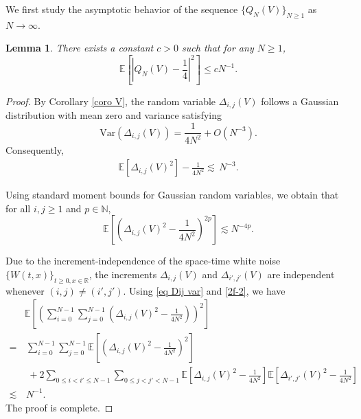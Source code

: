 \documentclass[11pt,reqno]{amsart}
\numberwithin{equation}{section}
\newtheorem{lemma}{Lemma}[section]
\newcommand{\1}{{\bf 1}}
\newcommand{\2}{{\bf 2}}
\begin{document}
   We first  study  the asymptotic behavior of the sequence   $\{Q_{N}(V)\}_{ N\ge 1}$  as $N\rightarrow\infty$.
  	 	    	\begin{lemma}\label{lem linear app}   There exists a constant $c>0$ such that for any $N\ge 1$, 
		\begin{equation}\label{2f-10}
			\mathbb{E}\left[ \left| Q_{N}(V) -\frac14\right|^2   \right]  \le c N^{-1}.
					\end{equation} 
	\end{lemma}
 \begin{proof}
By  Corollary \ref{coro V},     the random variable  $ \Delta_{i,j}(V)$  follows  a  Gaussian distribution with mean zero and   variance  satisfying 
$$ \mathrm{Var} \left(\Delta_{i,j}(V)\right)= \frac{1}{4N^2} +O\left(N^{-3}\right).$$ 
Consequently, 
\begin{align}\label{eq Dij var}
\mathbb E\left[\Delta_{i,j}(V)^{2}\right] - \frac{1}{4N^2} \lesssim \,  N^{-3}.
\end{align}

  Using  standard moment bounds for  Gaussian random variables, we obtain that for all $i, j\geq 1$ and $p\in \mathbb N$,	 
	\begin{equation}\label{2f-2}
			\mathbb{E}\left[   \left( \Delta_{i,j}(V)^{2} - \frac{1}{4N^{2}}\right) ^{2p}\right]\lesssim  N^{-4p}.
		\end{equation} 
	
	Due to the  increment-independence  of the space-time white  noise $\{W(t, x)\}_{t\ge0, x\in\mathbb R}$,     	  the increments 
  $\Delta_{i,j}(V) $ and $\Delta_{i',j'}(V) $ are independent whenever  $(i, j)\neq (i', j')$.  Using \eqref{eq Dij var} and \eqref{2f-2},  we  have
       \begin{align*}
&   \mathbb{E}\left[   \left(\sum_{i=0}^{N-1}\sum_{j=0}^{N-1}  \left(     \Delta_{i,j}(V) ^{2} - \frac{1}{4N^2}\right)  \right)^{2}\right]   \\
  = & \,     \sum_{i=0}^{N-1}   \sum_{j=0}^{N-1}   \mathbb{E} \left[  \left(    \Delta_{i,j}(V)  ^{2} - \frac{1}{4N^2}  \right)^{2}\right]\\
  &\,\, + 2 \sum_{0\le i<i'\le N-1}    \sum_{0\le j<j'<N-1}    \mathbb{E} \left[       \Delta_{i,j}(V)^{2} - \frac{1}{4N^2}    \right]   \mathbb{E} \left[   \Delta_{i',j'}(V)^{2} - \frac{1}{4N^2}    \right]\\
\lesssim    &\,   N^{-1}.
    \end{align*} 
        The proof is complete. 
     \end{proof}
 
\end{document}
